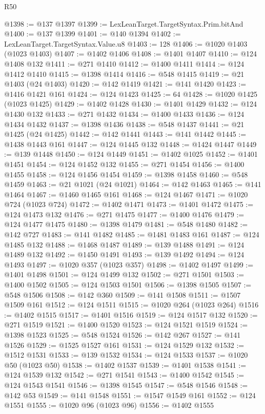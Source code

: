 \begin{lexlean}{R50}
\begin{coremodule}
{{{{{{{{{{{{{{{{{{{{{{{{{{{{{{{{{{{{{{{{{{{{{{{{{{{{{{{{{{{{@1398 := @137 @1397
@1399 := LexLeanTarget.TargetSyntax.Prim.bitAnd
@1400 := @137 @1399
@1401 := @140 @1394
@1402 := LexLeanTarget.TargetSyntax.Value.u8
@1403 := 128
@1406 := @1020 @1403 (@1023 @1403)
@1407 := @1402 @1406
@1408 := @1401 @1407
@1410 := @124 @1408 @132
@1411 := @271 @1410
@1412 := @1400 @1411
@1414 := @124 @1412 @1410
@1415 := @1398 @1414
@1416 := @548 @1415
@1419 := @21 @1403 (@24 @1403)
@1420 := @142 @1419
@1421 := @141 @1420
@1423 := @1416 @1421 @161
@1424 := @124 @1423
@1425 := 64
@1428 := @1020 @1425 (@1023 @1425)
@1429 := @1402 @1428
@1430 := @1401 @1429
@1432 := @124 @1430 @132
@1433 := @271 @1432
@1434 := @1400 @1433
@1436 := @124 @1434 @1432
@1437 := @1398 @1436
@1438 := @548 @1437
@1441 := @21 @1425 (@24 @1425)
@1442 := @142 @1441
@1443 := @141 @1442
@1445 := @1438 @1443 @161
@1447 := @124 @1445 @132
@1448 := @1424 @1447
@1449 := @139 @1448
@1450 := @124 @1449
@1451 := @1402 @1025
@1452 := @1401 @1451
@1454 := @124 @1452 @132
@1455 := @271 @1454
@1456 := @1400 @1455
@1458 := @124 @1456 @1454
@1459 := @1398 @1458
@1460 := @548 @1459
@1463 := @21 @1021 (@24 @1021)
@1464 := @142 @1463
@1465 := @141 @1464
@1467 := @1460 @1465 @161
@1468 := @124 @1467
@1471 := @1020 @724 (@1023 @724)
@1472 := @1402 @1471
@1473 := @1401 @1472
@1475 := @124 @1473 @132
@1476 := @271 @1475
@1477 := @1400 @1476
@1479 := @124 @1477 @1475
@1480 := @1398 @1479
@1481 := @548 @1480
@1482 := @142 @727
@1483 := @141 @1482
@1485 := @1481 @1483 @161
@1487 := @124 @1485 @132
@1488 := @1468 @1487
@1489 := @139 @1488
@1491 := @124 @1489 @132
@1492 := @1450 @1491
@1493 := @139 @1492
@1494 := @124 @1493
@1497 := @1020 @357 (@1023 @357)
@1498 := @1402 @1497
@1499 := @1401 @1498
@1501 := @124 @1499 @132
@1502 := @271 @1501
@1503 := @1400 @1502
@1505 := @124 @1503 @1501
@1506 := @1398 @1505
@1507 := @548 @1506
@1508 := @142 @360
@1509 := @141 @1508
@1511 := @1507 @1509 @161
@1512 := @124 @1511
@1515 := @1020 @264 (@1023 @264)
@1516 := @1402 @1515
@1517 := @1401 @1516
@1519 := @124 @1517 @132
@1520 := @271 @1519
@1521 := @1400 @1520
@1523 := @124 @1521 @1519
@1524 := @1398 @1523
@1525 := @548 @1524
@1526 := @142 @267
@1527 := @141 @1526
@1529 := @1525 @1527 @161
@1531 := @124 @1529 @132
@1532 := @1512 @1531
@1533 := @139 @1532
@1534 := @124 @1533
@1537 := @1020 @50 (@1023 @50)
@1538 := @1402 @1537
@1539 := @1401 @1538
@1541 := @124 @1539 @132
@1542 := @271 @1541
@1543 := @1400 @1542
@1545 := @124 @1543 @1541
@1546 := @1398 @1545
@1547 := @548 @1546
@1548 := @142 @53
@1549 := @141 @1548
@1551 := @1547 @1549 @161
@1552 := @124 @1551
@1555 := @1020 @96 (@1023 @96)
@1556 := @1402 @1555
}}}}}}}}}}}}}}}}}}}}}}}}}}}}}}}}}}}}}}}}}}}}}}}}}}}}}}}}}}}}
\end{coremodule}
\end{lexlean}
